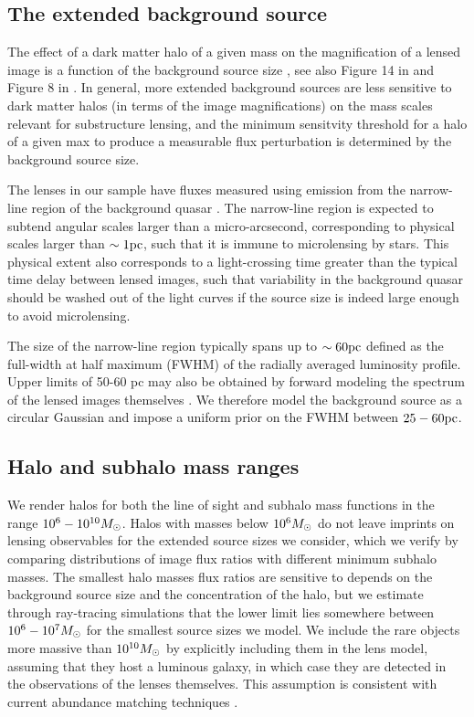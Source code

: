 \subsection{The extended background source}
\label{ssec:srcassumptions}
The effect of a dark matter halo of a given mass on the magnification of a lensed image is a function of the background source size \citep{DoblerKeeton02}, see also Figure 14 in \citet{Amara++06} and Figure 8 in \citet{Xu++12}. In general, more extended background sources are less sensitive to dark matter halos (in terms of the image magnifications) on the mass scales relevant for substructure lensing, and the minimum sensitvity threshold for a halo of a given max to produce a measurable flux perturbation is determined by the background source size. 

The lenses in our sample have fluxes measured using emission from the narrow-line region of the background quasar \citep{Nierenberg++17, Nierenberg++19}. The narrow-line region is expected to subtend angular scales larger than a micro-arcsecond, corresponding to physical scales larger than $\sim 1 \rm{pc}$, such that it is immune to microlensing by stars. This physical extent also corresponds to a light-crossing time greater than the typical time delay between lensed images, such that variability in the background quasar should be washed out of the light curves if the source size is indeed large enough to avoid microlensing. 

The size of the narrow-line region typically spans up to $\sim 60 \rm{pc}$ \citep{MullerSanchez++11} defined as the full-width at half maximum (FWHM) of the radially averaged luminosity profile. Upper limits of 50-60 pc may also be obtained by forward modeling the spectrum of the lensed images themselves \citep{Nierenberg++17}. We therefore model the background source as a circular Gaussian and impose a uniform prior on the FWHM between $25 - 60 \rm{pc}$. 

\subsection{Halo and subhalo mass ranges}
We render halos for both the line of sight and subhalo mass functions in the range $10^6 - 10^{10} {M_{\odot}}$. Halos with masses below $10^{6} {M_{\odot}}$ do not leave imprints on lensing observables for the extended source sizes we consider, which we verify by comparing distributions of image flux ratios with different minimum subhalo masses. The smallest halo masses flux ratios are sensitive to depends on the background source size and the concentration of the halo, but we estimate through ray-tracing simulations that the lower limit lies somewhere between $10^6  - 10^7 {M_{\odot}}$ for the smallest source sizes we model. We include the rare objects more massive than $10^{10} {M_{\odot}}$ by explicitly including them in the lens model, assuming that they host a luminous galaxy, in which case they are detected in the observations of the lenses themselves. This assumption is consistent with current abundance matching techniques \citep{Kim++17b,Nadler++19}. 

